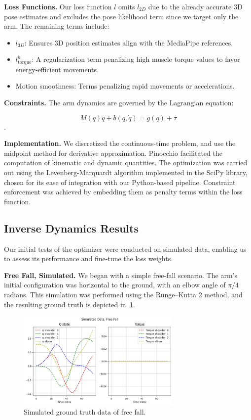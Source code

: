 \noindent\textbf{Loss Functions.} Our loss function \(l\) omits \(l_{2D}\) due to the already accurate 3D pose estimates and 
excludes the pose likelihood term since we target only the arm. The remaining terms include:

\begin{itemize}
    \item 
        \(l_{3D}\): Ensures 3D position estimates align with the MediaPipe references.
    \item
        \(l_{\text{torque}}^h\): A regularization term penalizing high muscle torque values to favor energy-efficient movements.
    \item 
        Motion smoothness: Terms penalizing rapid movements or accelerations.
\end{itemize}

\noindent\textbf{Constraints.} The arm dynamics are governed by the Lagrangian equation:

\[
M(q)\ddot{q} + b(q, \dot{q}) = g(q) + \tau
\].

\noindent\textbf{Implementation.} We discretized the continuous-time problem, 
and use the midpoint method for derivative approximation. 
Pinocchio facilitated the computation of kinematic and dynamic quantities. 
The optimization was carried out using the Levenberg-Marquardt algorithm implemented in the SciPy library, 
chosen for its ease of integration with our Python-based pipeline. 
Constraint enforcement was achieved by embedding them as penalty terms within the loss function.

\subsection{Inverse Dynamics Results}
\label{subsec:dynamic_results}

Our initial tests of the optimizer were conducted on simulated data, enabling us to assess its performance and fine-tune the loss weights.

\noindent\textbf{Free Fall, Simulated.} We began with a simple free-fall scenario. The arm's initial configuration was horizontal to the ground, with an elbow angle of 
\(\pi/4\) radians. This simulation was performed using the Runge–Kutta 2 method, and the resulting ground truth is depicted 
in~\cref{fig:gt_free_fall}.

\begin{figure}
    \centering
    \includegraphics[width=8cm]{figures/free_fall_gt.png}
    \caption{Simulated ground truth data of free fall.}
    \label{fig:gt_free_fall}
\end{figure}

